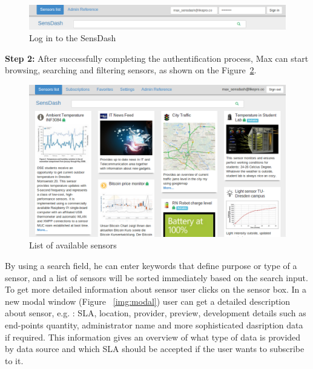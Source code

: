 \begin{figure}[!ht]
\centering
\includegraphics[scale=0.5]{Screenshots/signIn.png}   
\caption[Log in to the SensDash]{Log in to the SensDash}
\label{img:log_in}                        
\end{figure}

\textbf{Step 2:} After successfully completing the authentification process, Max can start browsing, searching and filtering sensors, as shown on the Figure~\ref{img:welcome_screen}.

\begin{figure}[!ht]
\centering
\includegraphics[scale=0.5]{Screenshots/Welcome.png}   
\caption[List of available sensors]{List of available sensors}
\label{img:welcome_screen}                       
\end{figure}

 By using a search field, he can enter keywords that define purpose or type of a sensor, and a list of sensors will be sorted immediately based on the search input. To get more detailed information about sensor user clicks on the sensor box. In a new modal window (Figure ~\ref{img:modal}) user can get a detailed description about sensor, e.g. : SLA, location, provider, preview, development details such as end-points quantity, administrator name and more sophisticated dasription data if required. This information gives an overview of what type of data is provided by data source and which SLA should be accepted if the user wants to subscribe to it.

